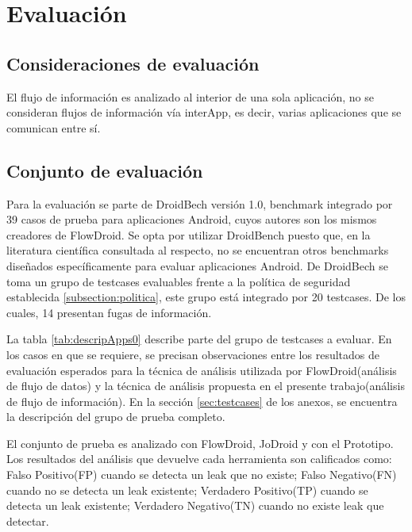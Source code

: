 \label{ch:evaluacion}
\chapter{Evaluación}

\section{Consideraciones de evaluación}
El flujo de información es analizado al interior de una sola aplicación, no se
consideran flujos de información vía interApp, es decir, varias aplicaciones que
se comunican entre sí.

\section{Conjunto de evaluación}
\label{sec:evalSet}
Para la evaluación se parte de DroidBech versión 1.0\cite{DroidBenchBenchmarks},
benchmark integrado por 39 casos de prueba para aplicaciones Android, cuyos
autores son los mismos creadores de FlowDroid. Se opta por utilizar DroidBench
puesto que, en la literatura científica consultada al respecto, no se encuentran
otros benchmarks diseñados específicamente para evaluar aplicaciones Android.\newline 
De DroidBech se toma un grupo de testcases evaluables frente a la política de
seguridad establecida \ref{subsection:politica}, este grupo está integrado por
20 testcases. De los cuales, 14 presentan fugas de información.

La tabla \ref{tab:descripApps0} describe parte del grupo de testcases a
evaluar. En los casos en que se requiere, se precisan observaciones entre los
resultados de evaluación esperados para la técnica de análisis utilizada por
FlowDroid(análisis de flujo de datos) y la técnica de análisis propuesta en el
presente trabajo(análisis de flujo de información).
En la sección \ref{sec:testcases} de los anexos, se encuentra la
descripción del grupo de prueba completo.

El conjunto de prueba es analizado con FlowDroid, JoDroid y con el Prototipo. Los
resultados del análisis que devuelve cada herramienta son calificados como:
Falso Positivo(FP) cuando se detecta un leak que no existe; Falso Negativo(FN)
cuando no se detecta un leak existente; Verdadero Positivo(TP) cuando se detecta
un leak existente; Verdadero Negativo(TN) cuando no existe leak que detectar.

